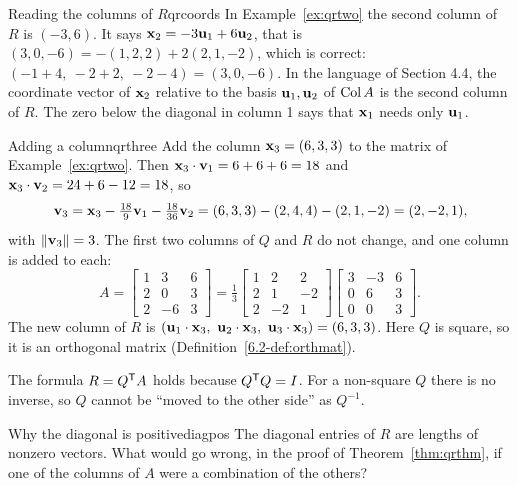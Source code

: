 \documentclass[11pt]{article}
\begin{document}
\begin{exmp}{Reading the columns of $R$}{qrcoords}
In Example~\ref{ex:qrtwo} the second column of $R$ is $(-3,6)$. It says $\mathbf{x}_2=-3\mathbf{u}_1+6\mathbf{u}_2$, that is $(3,0,-6)=-(1,2,2)+2(2,1,-2)$, which is correct: $(-1+4,\ -2+2,\ -2-4)=(3,0,-6)$. In the language of Section 4.4, the coordinate vector of $\mathbf{x}_2$ relative to the basis $\mathbf{u}_1,\mathbf{u}_2$ of $\operatorname{Col} A$ is the second column of $R$. The zero below the diagonal in column 1 says that $\mathbf{x}_1$ needs only $\mathbf{u}_1$.
\end{exmp}

\begin{exmp}{Adding a column}{qrthree}
Add the column $\mathbf{x}_3=(6,3,3)$ to the matrix of Example~\ref{ex:qrtwo}. Then $\mathbf{x}_3\cdot\mathbf{v}_1=6+6+6=18$ and $\mathbf{x}_3\cdot\mathbf{v}_2=24+6-12=18$, so
\[
\mathbf{v}_3=\mathbf{x}_3-\tfrac{18}9\mathbf{v}_1-\tfrac{18}{36}\mathbf{v}_2=(6,3,3)-(2,4,4)-(2,1,-2)=(2,-2,1),
\]
with $\lVert\mathbf{v}_3\rVert=3$. The first two columns of $Q$ and $R$ do not change, and one column is added to each:
\[
A=\begin{bmatrix}1&3&6\\2&0&3\\2&-6&3\end{bmatrix}=\tfrac13\begin{bmatrix}1&2&2\\2&1&-2\\2&-2&1\end{bmatrix}\begin{bmatrix}3&-3&6\\0&6&3\\0&0&3\end{bmatrix}.
\]
The new column of $R$ is $(\bv{u}_1\cdot\bv{x}_3,\ \bv{u}_2\cdot\bv{x}_3,\ \bv{u}_3\cdot\bv{x}_3)=(6,3,3)$. Here $Q$ is square, so it is an orthogonal matrix (Definition~\ref{6.2-def:orthmat}).
\end{exmp}

\begin{warn}
The formula $R=Q^{\mathsf T} A$ holds because $Q^{\mathsf T} Q=I$. For a non-square $Q$ there is no inverse, so $Q$ cannot be ``moved to the other side'' as $Q^{-1}$.
\end{warn}

\begin{think}{Why the diagonal is positive}{diagpos}
The diagonal entries of $R$ are lengths of nonzero vectors. What would go wrong, in the proof of Theorem~\ref{thm:qrthm}, if one of the columns of $A$ were a combination of the others?
\end{think}
\end{document}
